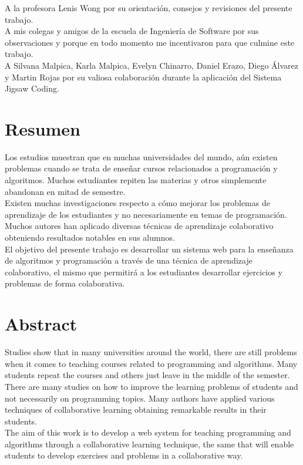 A la profesora Lenis Wong por su orientación, consejos  y revisiones del presente trabajo.\\

A mis colegas y amigos de la escuela de Ingeniería de Software por sus observaciones y porque en todo momento me incentivaron para que culmine este trabajo.\\

A Silvana Malpica, Karla Malpica, Evelyn Chinarro, Daniel Erazo, Diego Álvarez y Martin Rojas por su valiosa colaboración durante la aplicación del Sistema Jigsaw Coding.

\chapter*{Resumen}

Los estudios muestran que en muchas universidades del mundo, aún existen problemas cuando se trata de enseñar cursos relacionados a programación y algoritmos. Muchos estudiantes repiten las materias y otros simplemente abandonan en mitad de semestre.\\

Existen muchas investigaciones respecto a cómo mejorar los problemas de aprendizaje de los estudiantes y no necesariamente en temas de programación. Muchos autores han aplicado diversas técnicas de aprendizaje colaborativo obteniendo resultados notables en sus alumnos.\\

El objetivo del presente trabajo es desarrollar un sistema web para la enseñanza de algoritmos y programación a través de una técnica de aprendizaje colaborativo, el mismo que permitirá a los estudiantes desarrollar ejercicios y problemas de forma colaborativa.

\chapter*{Abstract}
Studies show that in many universities around the world, there are still problems when it comes to teaching courses related to programming and algorithms. Many students repeat the courses and others just leave in the middle of the semester. \\

There are many studies on how to improve the learning problems of students and not necessarily on programming topics. Many authors have applied various techniques of collaborative learning obtaining remarkable results in their students. \\

The aim of this work is to develop a web system for teaching programming and algorithms through a collaborative learning technique, the same that will enable students to develop exercises and problems in a collaborative way.
